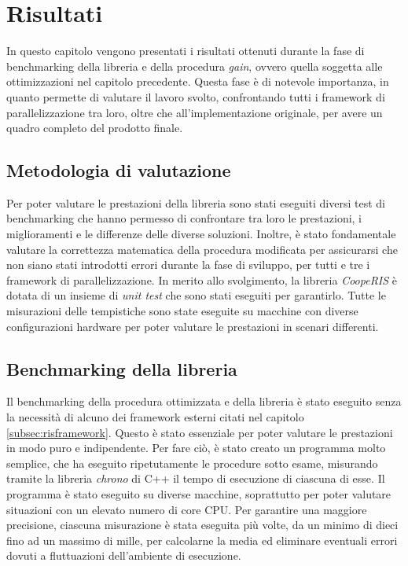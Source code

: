 \chapter{Risultati}
\label{ch:risultati}

In questo capitolo vengono presentati i risultati ottenuti durante la fase di
benchmarking della libreria e della procedura \textit{gain}, ovvero quella
soggetta alle ottimizzazioni nel capitolo precedente. Questa fase è di notevole importanza,
in quanto permette di valutare il lavoro svolto, confrontando tutti i framework di
parallelizzazione tra loro, oltre che all'implementazione originale, per avere un
quadro completo del prodotto finale.

\section{Metodologia di valutazione}
\label{sec:bencharmking}

Per poter valutare le prestazioni della libreria sono stati eseguiti diversi
test di benchmarking che hanno permesso di confrontare tra loro le prestazioni, i
miglioramenti e le differenze delle diverse soluzioni. Inoltre, è stato fondamentale
valutare la correttezza matematica della procedura modificata per assicurarsi che
non siano stati introdotti errori durante la fase di sviluppo, per tutti e tre i
framework di parallelizzazione. In merito allo svolgimento, la libreria \textit{CoopeRIS}
è dotata di un insieme di \textit{unit test} che sono stati eseguiti per
garantirlo. Tutte le misurazioni delle tempistiche sono state eseguite su macchine
con diverse configurazioni hardware per poter valutare le prestazioni in scenari
differenti.

\section{Benchmarking della libreria}
\label{sec:benchmarking}

Il benchmarking della procedura ottimizzata e della libreria è stato eseguito
senza la necessità di alcuno dei framework esterni citati nel capitolo
\ref{subsec:risframework}. Questo è stato essenziale per poter valutare le prestazioni
in modo puro e indipendente. Per fare ciò, è stato creato un programma molto semplice,
che ha eseguito ripetutamente le procedure sotto esame, misurando tramite la libreria
\textit{chrono} di C++ il tempo di esecuzione di ciascuna di esse. Il programma è
stato eseguito su diverse macchine, soprattutto per poter valutare situazioni
con un elevato numero di core CPU. Per garantire una maggiore precisione,
ciascuna misurazione è stata eseguita più volte, da un minimo di dieci fino ad un
massimo di mille, per calcolarne la media ed eliminare eventuali errori dovuti a
fluttuazioni dell'ambiente di esecuzione.

